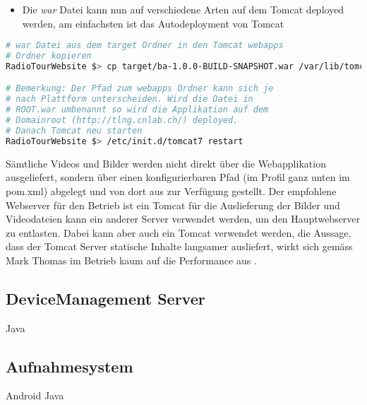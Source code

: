 \begin{itemize}
\item Die \textit{war} Datei kann nun auf verschiedene Arten auf dem Tomcat deployed werden, am einfachsten ist das Autodeployment von Tomcat
\end{itemize}
\begin{lstlisting}[language=Bash, caption=Deployment auf Tomcat]
# war Datei aus dem target Ordner in den Tomcat webapps
# Ordner kopieren
RadioTourWebsite $> cp target/ba-1.0.0-BUILD-SNAPSHOT.war /var/lib/tomcat7/webapps/ROOT.war

# Bemerkung: Der Pfad zum webapps Ordner kann sich je
# nach Plattform unterscheiden. Wird die Datei in
# ROOT.war umbenannt so wird die Applikation auf dem
# Domainroot (http://tlng.cnlab.ch/) deployed.
# Danach Tomcat neu starten
RadioTourWebsite $> /etc/init.d/tomcat7 restart

\end{lstlisting}

Sämtliche Videos und Bilder werden nicht direkt über die Webapplikation ausgeliefert, sondern über einen konfigurierbaren Pfad (im Profil ganz unten im pom.xml) abgelegt und von dort aus zur Verfügung gestellt. Der empfohlene Webserver für den Betrieb ist ein Tomcat für die Auslieferung der Bilder und Videodateien kann ein anderer Server verwendet werden, um den Hauptwebserver zu entlasten. Dabei kann aber auch ein Tomcat verwendet werden, die Aussage, dass der Tomcat Server statische Inhalte langsamer ausliefert, wirkt sich gemäss Mark Thomas im Betrieb kaum auf die Performance aus \cite{thomas2010}.

\subsection{DeviceManagement Server}
Java

\subsection{Aufnahmesystem}
Android Java
